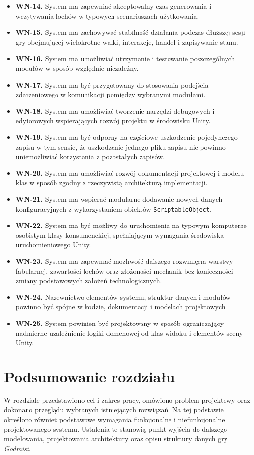 \begin{itemize}
    \item \textbf{WN-14.} System ma zapewniać akceptowalny czas generowania i wczytywania lochów w typowych scenariuszach użytkowania.
    \item \textbf{WN-15.} System ma zachowywać stabilność działania podczas dłuższej sesji gry obejmującej wielokrotne walki, interakcje, handel i zapisywanie stanu.
    \item \textbf{WN-16.} System ma umożliwiać utrzymanie i testowanie poszczególnych modułów w sposób względnie niezależny.
    \item \textbf{WN-17.} System ma być przygotowany do stosowania podejścia zdarzeniowego w komunikacji pomiędzy wybranymi modułami.
    \item \textbf{WN-18.} System ma umożliwiać tworzenie narzędzi debugowych i edytorowych wspierających rozwój projektu w środowisku Unity.
    \item \textbf{WN-19.} System ma być odporny na częściowe uszkodzenie pojedynczego zapisu w tym sensie, że uszkodzenie jednego pliku zapisu nie powinno uniemożliwiać korzystania z pozostałych zapisów.
    \item \textbf{WN-20.} System ma umożliwiać rozwój dokumentacji projektowej i modelu klas w sposób zgodny z rzeczywistą architekturą implementacji.
    \item \textbf{WN-21.} System ma wspierać modularne dodawanie nowych danych konfiguracyjnych z wykorzystaniem obiektów \texttt{ScriptableObject}.
    \item \textbf{WN-22.} System ma być możliwy do uruchomienia na typowym komputerze osobistym klasy konsumenckiej, spełniającym wymagania środowiska uruchomieniowego Unity.
    \item \textbf{WN-23.} System ma zapewniać możliwość dalszego rozwinięcia warstwy fabularnej, zawartości lochów oraz złożoności mechanik bez konieczności zmiany podstawowych założeń technologicznych.
    \item \textbf{WN-24.} Nazewnictwo elementów systemu, struktur danych i modułów powinno być spójne w kodzie, dokumentacji i modelach projektowych.
    \item \textbf{WN-25.} System powinien być projektowany w sposób ograniczający nadmierne uzależnienie logiki domenowej od klas widoku i elementów sceny Unity.
\end{itemize}

\section{Podsumowanie rozdziału}
\label{sec:podsumowanie-rozdzialu-1}

W rozdziale przedstawiono cel i zakres pracy, omówiono problem projektowy oraz dokonano przeglądu wybranych istniejących rozwiązań. Na tej podstawie określono również podstawowe wymagania funkcjonalne i niefunkcjonalne projektowanego systemu. Ustalenia te stanowią punkt wyjścia do dalszego modelowania, projektowania architektury oraz opisu struktury danych gry \emph{Godmist}.